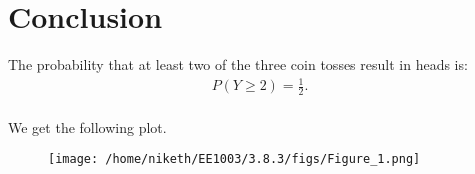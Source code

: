 \documentclass[journal]{IEEEtran}
\begin{document}
\section{Conclusion}
The probability that at least two of the three coin tosses result in heads is:
\begin{align}
P(Y \geq 2) = \frac{1}{2}.
\end{align}\\
We get the following plot.
\begin{figure}[!ht]
    \centering
    \texttt{[image: /home/niketh/EE1003/3.8.3/figs/Figure\_1.png]}
    \caption{}
\end{figure}
\end{document}

